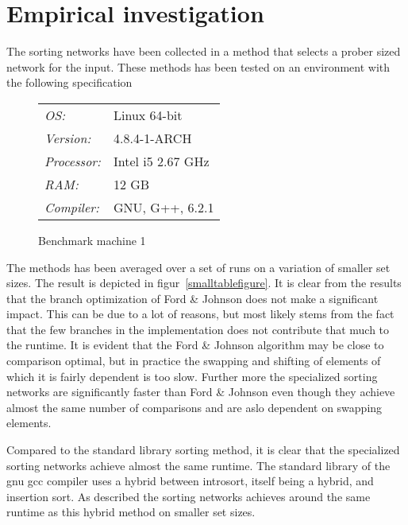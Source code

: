 \section{Empirical investigation}
The sorting networks have been collected in a method that selects a prober
sized network for the input. These methods has been tested on an environment
with the following specification\\

\begin{figure}
    \centering
    \begin{tabular}{ll}
            \textit{OS:} & Linux 64-bit\\
            \textit{Version:} & 4.8.4-1-ARCH\\
            \textit{Processor:} & Intel i5 2.67 GHz\\
            \textit{RAM:} & 12 GB\\
            \textit{Compiler:} & GNU, G++, 6.2.1
    \end{tabular}
    \caption{Benchmark machine 1}
    \label{fig:pc1}
\end{figure}

The methods has been averaged over a set of runs on a variation of smaller set
sizes. The result is depicted in figur~\ref{smalltablefigure}. It is clear from
the results that the branch optimization of Ford \& Johnson does not make a
significant impact. This can be due to a lot of reasons, but most likely stems
from the fact that the few branches in the implementation does not contribute
that much to the runtime. It is evident that the Ford \& Johnson algorithm may
be close to comparison optimal, but in practice the swapping and shifting of
elements of which it is fairly dependent is too slow. Further more the
specialized sorting networks are significantly faster than Ford \& Johnson even
though they achieve almost the same number of comparisons and are aslo
dependent on swapping elements.

Compared to the standard library sorting method, it is clear that the
specialized sorting networks achieve almost the same runtime. The standard
library of the gnu gcc compiler uses a hybrid between introsort, itself being a
hybrid, and insertion sort\cite{gnustd}. As described the sorting networks
achieves around the same runtime as this hybrid method on smaller set sizes.

